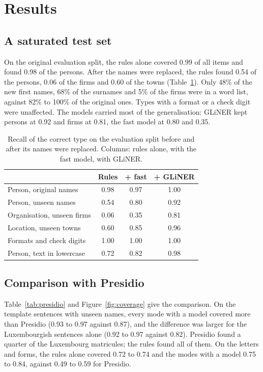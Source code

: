 \documentclass[10pt,a4paper,twocolumn]{article}
\begin{document}
\section{Results}

\subsection{A saturated test set}

On the original evaluation split, the rules alone covered 0.99 of all items and found 0.98 of the
persons. After the names were replaced, the rules found 0.54 of the persons, 0.06 of the firms and
0.60 of the towns (Table~\ref{tab:unseen}). Only 48\% of the new first names, 68\% of the surnames
and 5\% of the firms were in a word list, against 82\% to 100\% of the original ones. Types with a
format or a check digit were unaffected. The models carried most of the generalisation: GLiNER
kept persons at 0.92 and firms at 0.81, the fast model at 0.80 and 0.35.

\begin{table}[t]
\centering
\small
\caption{Recall of the correct type on the evaluation split before and after its names were replaced. Columns: rules alone, with the fast model, with GLiNER.}
\label{tab:unseen}
\begin{tabular}{@{}lccc@{}}
\toprule
 & Rules & + fast & + GLiNER \\
\midrule
Person, original names & 0.98 & 0.97 & 1.00 \\
Person, unseen names & 0.54 & 0.80 & 0.92 \\
Organisation, unseen firms & 0.06 & 0.35 & 0.81 \\
Location, unseen towns & 0.60 & 0.85 & 0.96 \\
Formats and check digits & 1.00 & 1.00 & 1.00 \\
Person, text in lowercase & 0.72 & 0.82 & 0.98 \\
\bottomrule
\end{tabular}
\end{table}

\subsection{Comparison with Presidio}

Table~\ref{tab:presidio} and Figure~\ref{fig:coverage} give the comparison. On the template
sentences with unseen names, every mode with a model covered more than Presidio (0.93 to 0.97
against 0.87), and the difference was larger for the Luxembourgish sentences alone (0.92 to 0.97
against 0.82). Presidio found a quarter of the Luxembourg matricules; the rules found all of them.
On the letters and forms, the rules alone covered 0.72 to 0.74 and the modes with a model 0.75 to
0.84, against 0.49 to 0.59 for Presidio.
\end{document}
